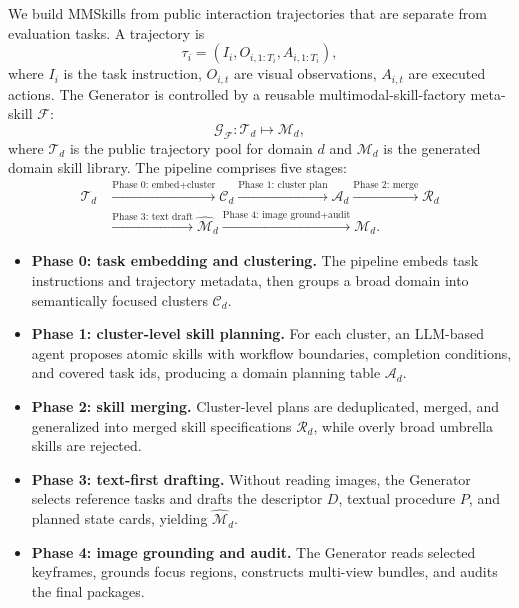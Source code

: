 \documentclass{llmxive}
\begin{document}
We build MMSkills from public interaction trajectories that are separate from evaluation tasks. A trajectory is
\begin{equation}
    \tau_i=(I_i,O_{i,1:T_i},A_{i,1:T_i}),
\end{equation}
where $I_i$ is the task instruction, $O_{i,t}$ are visual observations, $A_{i,t}$ are executed actions. The Generator is controlled by a reusable multimodal-skill-factory meta-skill $\mathcal{F}$:
\begin{equation}
    \mathcal{G}_{\mathcal{F}}:\mathcal{T}_d\mapsto\mathcal{M}_d,
    \label{eq:meta-generator}
\end{equation}
where $\mathcal{T}_d$ is the public trajectory pool for domain $d$ and $\mathcal{M}_d$ is the generated domain skill library. The pipeline comprises five stages:
\begin{equation}
\begin{aligned}
    \mathcal{T}_d
    &\xrightarrow{\text{Phase 0: embed+cluster}} \mathcal{C}_d
    \xrightarrow{\text{Phase 1: cluster plan}} \mathcal{A}_d
    \xrightarrow{\text{Phase 2: merge}} \mathcal{R}_d \\
    &\xrightarrow{\text{Phase 3: text draft}} \widehat{\mathcal{M}}_d
    \xrightarrow{\text{Phase 4: image ground+audit}} \mathcal{M}_d .
\end{aligned}
\label{eq:generator-pipeline}
\end{equation}

\begin{itemize}[leftmargin=*]
    \item \textbf{Phase 0: task embedding and clustering.} The pipeline embeds task instructions and trajectory metadata, then groups a broad domain into semantically focused clusters $\mathcal{C}_d$.
    \item \textbf{Phase 1: cluster-level skill planning.} For each cluster, an LLM-based agent proposes atomic skills with workflow boundaries, completion conditions, and covered task ids, producing a domain planning table $\mathcal{A}_d$.
    \item \textbf{Phase 2: skill merging.} Cluster-level plans are deduplicated, merged, and generalized into merged skill specifications $\mathcal{R}_d$, while overly broad umbrella skills are rejected.
    \item \textbf{Phase 3: text-first drafting.} Without reading images, the Generator selects reference tasks and drafts the descriptor $D$, textual procedure $P$, and planned state cards, yielding $\widehat{\mathcal{M}}_d$.
    \item \textbf{Phase 4: image grounding and audit.} The Generator reads selected keyframes, grounds focus regions, constructs multi-view bundles, and audits the final packages.
\end{itemize}
\end{document}
